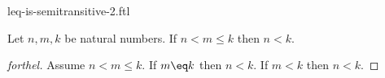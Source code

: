 \documentclass{stex}
\begin{document}
\begin{smodule}{leq-is-semitransitive-2.ftl}


\begin{proposition}[forthel,id=LeqIsSemitransitiveIIProp]
  Let $n, m, k$ be natural numbers.
  If $n \less m \leq k$ then $n \less k$.
\end{proposition}
\begin{proof}[forthel]
  Assume $n \less m \leq k$.
  If $m \eq k$ then $n \less k$.
  If $m \less k$ then $n \less k$.
\end{proof}

\end{smodule}
\end{document}
